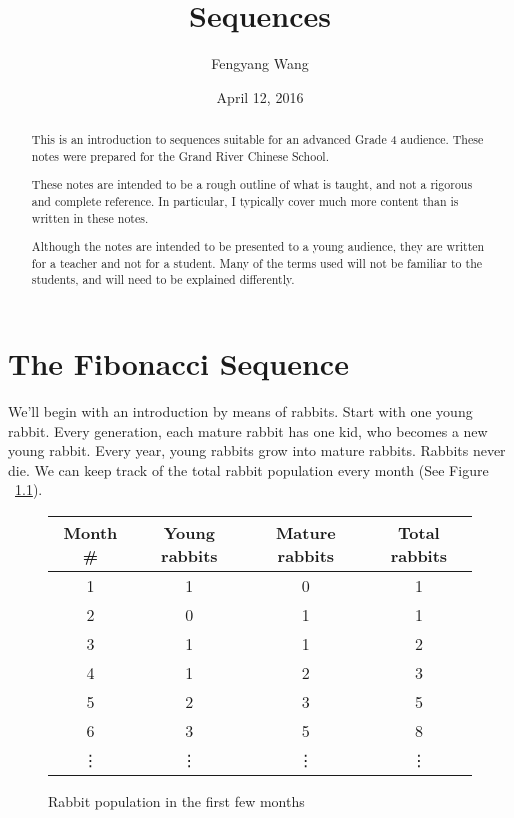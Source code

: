 \documentclass[a4paper,10pt]{report}
\title{Sequences}
\author{Fengyang Wang}
\date{April 12, 2016}
\begin{document}
\begin{abstract}

 This is an introduction to sequences suitable for an advanced Grade 4 audience.
 These notes were prepared for the Grand River Chinese School.

 These notes are intended to be a rough outline of what is taught, and not a
 rigorous and complete reference. In particular, I typically cover much more
 content than is written in these notes.

 Although the notes are intended to be presented to a young audience, they are
 written for a teacher and not for a student. Many of the terms used will not be
 familiar to the students, and will need to be explained differently.

\end{abstract}

\maketitle

\tableofcontents

\chapter{The Fibonacci Sequence}

We'll begin with an introduction by means of rabbits. Start with one young
rabbit. Every generation, each mature rabbit has one kid, who becomes a new
young rabbit. Every year, young rabbits grow into mature rabbits. Rabbits never
die. We can keep track of the total rabbit population every month (See Figure
~\ref{fib:rabbit}).

\begin{figure}
 \begin{tabular}{|c|c|c|c|}
  \hline
  Month \# & Young rabbits & Mature rabbits & Total rabbits \\
  \hline
  1 & 1 & 0 & 1 \\
  2 & 0 & 1 & 1 \\
  3 & 1 & 1 & 2 \\
  4 & 1 & 2 & 3 \\
  5 & 2 & 3 & 5 \\
  6 & 3 & 5 & 8 \\
  \vdots & \vdots & \vdots & \vdots \\
  \hline
 \end{tabular}

 \caption{Rabbit population in the first few months}

 \label{fib:rabbit}
\end{figure}
\end{document}
